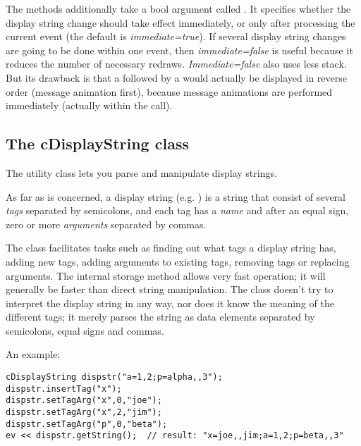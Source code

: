 The  methods additionally take a bool
argument called . It specifies whether the display
string change should take effect immediately, or only after processing
the current event (the default is \textit{immediate=true}). If several
display string changes are going to be done within one event, then
\textit{immediate=false} is useful because it reduces the number of
necessary redraws. \textit{Immediate=false} also uses less stack.  But
its drawback is that a  followed by a
 would actually be displayed in reverse order (message
animation first), because message animations are performed immediately
(actually within the  call).


\subsection{The cDisplayString class}

The  utility class lets you parse and
manipulate display strings.

As far as  is concerned, a display string
(e.g. ) is a string that consist of several
\textit{tags} separated by semicolons, and each tag has a \textit{name}
and after an equal sign, zero or more \textit{arguments} separated by commas.

The class facilitates tasks such as finding out what tags a display string
has, adding new tags, adding arguments to existing tags,
removing tags or replacing arguments. The internal storage method allows
very fast operation; it will generally be faster than direct string manipulation.
The class doesn't try to interpret the display string in any way, nor does
it know the meaning of the different tags; it merely parses the string
as data elements separated by semicolons, equal signs and commas.

An example:

\begin{Verbatim}
cDisplayString dispstr("a=1,2;p=alpha,,3");
dispstr.insertTag("x");
dispstr.setTagArg("x",0,"joe");
dispstr.setTagArg("x",2,"jim");
dispstr.setTagArg("p",0,"beta");
ev << dispstr.getString();  // result: "x=joe,,jim;a=1,2;p=beta,,3"
\end{Verbatim}




